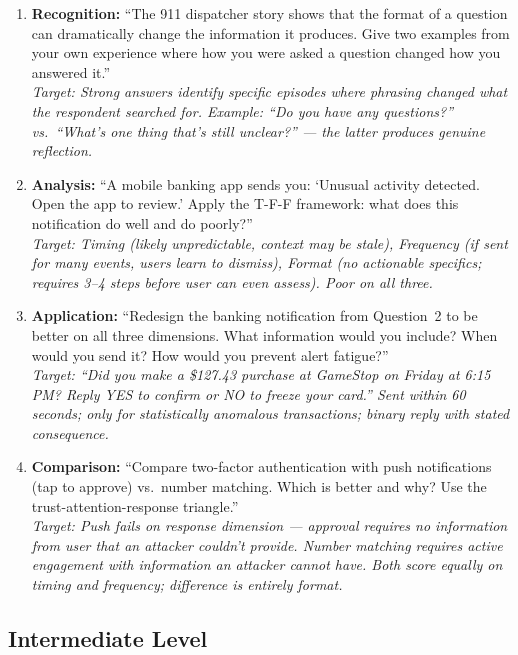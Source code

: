 \begin{enumerate}
    \item \textbf{Recognition:} ``The 911 dispatcher story shows that the format of a question can dramatically change the information it produces. Give two examples from your own experience where how you were asked a question changed how you answered it.''\\
    \textit{Target: Strong answers identify specific episodes where phrasing changed what the respondent searched for. Example: ``Do you have any questions?'' vs.\ ``What's one thing that's still unclear?'' --- the latter produces genuine reflection.}

    \item \textbf{Analysis:} ``A mobile banking app sends you: `Unusual activity detected. Open the app to review.' Apply the T-F-F framework: what does this notification do well and do poorly?''\\
    \textit{Target: Timing (likely unpredictable, context may be stale), Frequency (if sent for many events, users learn to dismiss), Format (no actionable specifics; requires 3--4 steps before user can even assess). Poor on all three.}

    \item \textbf{Application:} ``Redesign the banking notification from Question~2 to be better on all three dimensions. What information would you include? When would you send it? How would you prevent alert fatigue?''\\
    \textit{Target: ``Did you make a \$127.43 purchase at GameStop on Friday at 6:15 PM? Reply YES to confirm or NO to freeze your card.'' Sent within 60 seconds; only for statistically anomalous transactions; binary reply with stated consequence.}

    \item \textbf{Comparison:} ``Compare two-factor authentication with push notifications (tap to approve) vs.\ number matching. Which is better and why? Use the trust-attention-response triangle.''\\
    \textit{Target: Push fails on response dimension --- approval requires no information from user that an attacker couldn't provide. Number matching requires active engagement with information an attacker cannot have. Both score equally on timing and frequency; difference is entirely format.}
\end{enumerate}

\subsection{Intermediate Level}

